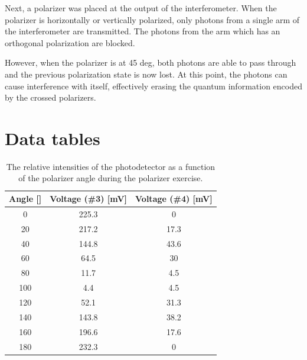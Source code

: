 \documentclass[notitlepage]{report}
\begin{document}
	Next, a polarizer was placed at the output of the interferometer. When the polarizer is horizontally or vertically polarized, only photons from a single arm of the interferometer are transmitted. The photons from the arm which has an orthogonal polarization are blocked.
	
	However, when the polarizer is at 45 deg, both photons are able to pass through and the previous polarization state is now lost. At this point, the photons can cause interference with itself, effectively erasing the quantum information encoded by the crossed polarizers.
	
	
	\pagebreak
	\section*{Data tables}
	\begin{table}[h]
		\centering
		\caption{The relative intensities of the photodetector as a function of the polarizer angle during the polarizer exercise.}
		\label{table:polarizerex}
		\begin{tabular}{ccc}
			\toprule
			Angle [\si{\deg}] & Voltage (\#3) [\si{\mV}] & Voltage (\#4) [\si{\mV}] \\
			\midrule
			0           & 225.3         & 0             \\
			20          & 217.2         & 17.3          \\
			40          & 144.8         & 43.6          \\
			60          & 64.5          & 30            \\
			80          & 11.7          & 4.5           \\
			100         & 4.4           & 4.5           \\
			120         & 52.1          & 31.3          \\
			140         & 143.8         & 38.2          \\
			160         & 196.6         & 17.6          \\
			180         & 232.3         & 0             \\
			\bottomrule
		\end{tabular}
	\end{table}
\end{document}

